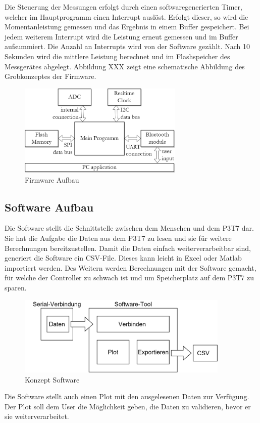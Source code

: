 Die Steuerung der Messungen erfolgt durch einen softwaregenerierten Timer, welcher im Hauptprogramm einen Interrupt auslöst. Erfolgt dieser, so wird die Momentanleistung gemessen und das Ergebnis in einem Buffer gespeichert. Bei jedem weiterem Interrupt wird die Leistung erneut gemessen und im Buffer aufsummiert. Die Anzahl an Interrupts wird von der Software gezählt. Nach 10 Sekunden wird die mittlere Leistung berechnet und im Flashspeicher des Messgerätes abgelegt. Abbildung XXX zeigt eine schematische Abbildung des Grobkonzeptes der Firmware.

\begin{figure}[H]
\begin{center}
\includegraphics[width=0.7\textwidth ]{images/Konzept_Firmware.png}
\caption{Firmware Aufbau}
\label{fig:Firmware_Aufbau}
\end{center}
\end{figure}

\subsection{Software Aufbau}
Die Software stellt die Schnittstelle zwischen dem Menschen und dem P3T7 dar. Sie hat die Aufgabe die Daten aus dem P3T7 zu lesen und sie für weitere Berechnungen bereitzustellen. Damit die Daten einfach weiterverarbeitbar sind, generiert die Software ein CSV-File. Dieses kann leicht in Excel oder Matlab importiert werden. Des Weitern werden Berechnungen mit der Software gemacht, für welche der Controller zu schwach ist und um Speicherplatz auf dem P3T7 zu sparen.

\begin{figure}[H]
\begin{center}
\includegraphics[width=0.9\textwidth]{images/Konzept_Software.png}
\caption{Konzept Software}
\end{center}
\end{figure}

Die Software stellt auch einen Plot mit den ausgelesenen Daten zur Verfügung. Der Plot soll dem User die Möglichkeit geben, die Daten zu validieren, bevor er sie weiterverarbeitet.